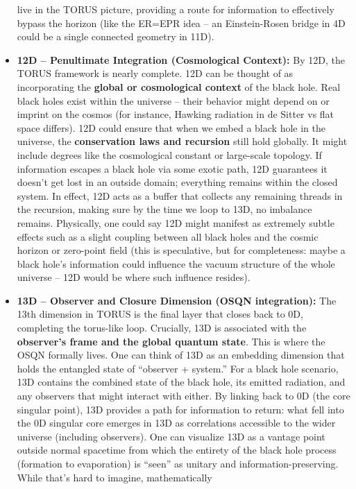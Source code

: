 \documentclass[]{article}
\begin{document}
\begin{itemize}
  live in the TORUS picture, providing a route for information to
  effectively bypass the horizon (like the ER=EPR idea -- an
  Einstein-Rosen bridge in 4D could be a single connected geometry in
  11D).
\item
  \textbf{12D -- Penultimate Integration (Cosmological Context):} By
  12D, the TORUS framework is nearly complete. 12D can be thought of as
  incorporating the \textbf{global or cosmological context} of the black
  hole. Real black holes exist within the universe -- their behavior
  might depend on or imprint on the cosmos (for instance, Hawking
  radiation in de Sitter vs flat space differs). 12D could ensure that
  when we embed a black hole in the universe, the \textbf{conservation
  laws and recursion} still hold globally. It might include degrees like
  the cosmological constant or large-scale topology. If information
  escapes a black hole via some exotic path, 12D guarantees it doesn't
  get lost in an outside domain; everything remains within the closed
  system. In effect, 12D acts as a buffer that collects any remaining
  threads in the recursion, making sure by the time we loop to 13D, no
  imbalance remains. Physically, one could say 12D might manifest as
  extremely subtle effects such as a slight coupling between all black
  holes and the cosmic horizon or zero-point field (this is speculative,
  but for completeness: maybe a black hole's information could influence
  the vacuum structure of the whole universe -- 12D would be where such
  influence resides).
\item
  \textbf{13D -- Observer and Closure Dimension (OSQN integration):} The
  13th dimension in TORUS is the final layer that closes back to 0D,
  completing the torus-like loop. Crucially, 13D is associated with the
  \textbf{observer's frame and the global quantum state}. This is where
  the OSQN formally lives. One can think of 13D as an embedding
  dimension that holds the entangled state of ``observer + system.'' For
  a black hole scenario, 13D contains the combined state of the black
  hole, its emitted radiation, and any observers that might interact
  with either. By linking back to 0D (the core singular point), 13D
  provides a path for information to return: what fell into the 0D
  singular core emerges in 13D as correlations accessible to the wider
  universe (including observers). One can visualize 13D as a vantage
  point outside normal spacetime from which the entirety of the black
  hole process (formation to evaporation) is ``seen'' as unitary and
  information-preserving. While that's hard to imagine, mathematically

\end{itemize}
\end{document}
